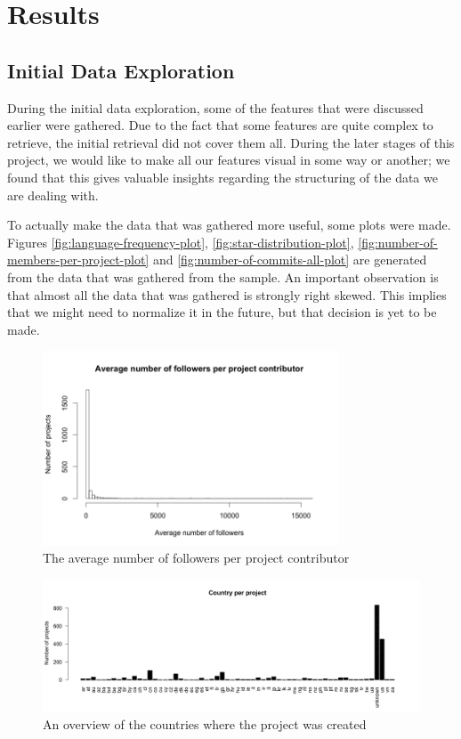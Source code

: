 \section{Results}
    \subsection{Initial Data Exploration}
        During the initial data exploration, some of the features that were discussed earlier were gathered. Due to the fact that some features are quite complex to retrieve, the initial retrieval did not cover them all. During the later stages of this project, we would like to make all our features visual in some way or another; we found that this gives valuable insights regarding the structuring of the data we are dealing with.
        
        To actually make the data that was gathered more useful, some plots were made. 
        Figures \ref{fig:language-frequency-plot}, \ref{fig:star-distribution-plot}, \ref{fig:number-of-members-per-project-plot} and \ref{fig:number-of-commits-all-plot} are generated from the data that was gathered from the sample.
        An important observation is that almost all the data that was gathered is strongly right skewed. %
        This implies that we might need to normalize it in the future, but that decision is yet to be made. 
        
	    \begin{figure}
	        \includegraphics[width=250pt]{figures/average-number-of-followers-per-project-contributor}
	        \caption{The average number of followers per project contributor}
	        \label{fig:avg-follower-contributor-plot}
	    \end{figure}

	    \begin{figure}
	        \includegraphics[width=500pt]{figures/country-per-project}
	        \caption{An overview of the countries where the project was created}
	        \label{fig:country-plot}
	    \end{figure}

